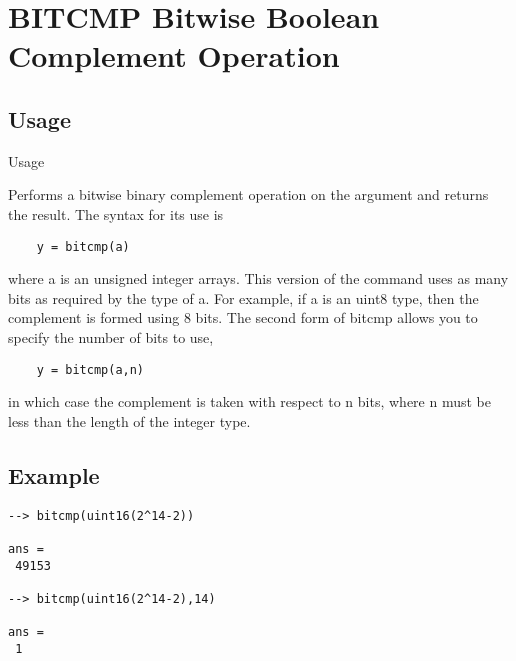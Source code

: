 \section{BITCMP Bitwise Boolean Complement Operation}

\subsection{Usage}

 Usage
 
 Performs a bitwise binary complement operation on the argument and
 returns the result.  The syntax for its use is
\begin{verbatim}
    y = bitcmp(a)
\end{verbatim}
 where a is an unsigned integer arrays.  This version of the command
 uses as many bits as required by the type of a.  For example, if 
 a is an uint8 type, then the complement is formed using 8 bits.
 The second form of bitcmp allows you to specify the number of bits
 to use, 
\begin{verbatim}
    y = bitcmp(a,n)
\end{verbatim}
 in which case the complement is taken with respect to n bits, where n must be 
 less than the length of the integer type.

\subsection{Example}

\begin{verbatim}
--> bitcmp(uint16(2^14-2))

ans = 
 49153 

--> bitcmp(uint16(2^14-2),14)

ans = 
 1 
\end{verbatim}
